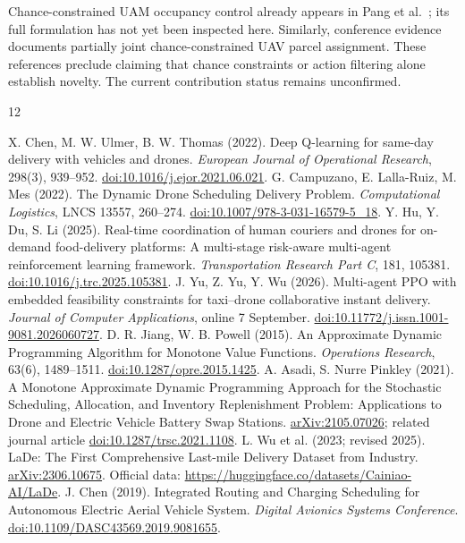 \documentclass[11pt,a4paper]{article}
\begin{document}
Chance-constrained UAM occupancy control already appears in Pang et al.\ \cite{pangchance}; its full formulation has not yet been inspected here. Similarly, conference evidence documents partially joint chance-constrained UAV parcel assignment. These references preclude claiming that chance constraints or action filtering alone establish novelty. The current contribution status remains unconfirmed.

\begin{thebibliography}{12}
\raggedright
{} X. Chen, M. W. Ulmer, B. W. Thomas (2022). Deep Q-learning for same-day delivery with vehicles and drones. \emph{European Journal of Operational Research}, 298(3), 939--952. \href{https://doi.org/10.1016/j.ejor.2021.06.021}{doi:10.1016/j.ejor.2021.06.021}.
 G. Campuzano, E. Lalla-Ruiz, M. Mes (2022). The Dynamic Drone Scheduling Delivery Problem. \emph{Computational Logistics}, LNCS 13557, 260--274. \href{https://doi.org/10.1007/978-3-031-16579-5_18}{doi:10.1007/978-3-031-16579-5\_18}.
 Y. Hu, Y. Du, S. Li (2025). Real-time coordination of human couriers and drones for on-demand food-delivery platforms: A multi-stage risk-aware multi-agent reinforcement learning framework. \emph{Transportation Research Part C}, 181, 105381. \href{https://doi.org/10.1016/j.trc.2025.105381}{doi:10.1016/j.trc.2025.105381}.
 J. Yu, Z. Yu, Y. Wu (2026). Multi-agent PPO with embedded feasibility constraints for taxi--drone collaborative instant delivery. \emph{Journal of Computer Applications}, online 7 September. \href{https://doi.org/10.11772/j.issn.1001-9081.2026060727}{doi:10.11772/j.issn.1001-9081.2026060727}.
 D. R. Jiang, W. B. Powell (2015). An Approximate Dynamic Programming Algorithm for Monotone Value Functions. \emph{Operations Research}, 63(6), 1489--1511. \href{https://doi.org/10.1287/opre.2015.1425}{doi:10.1287/opre.2015.1425}.
 A. Asadi, S. Nurre Pinkley (2021). A Monotone Approximate Dynamic Programming Approach for the Stochastic Scheduling, Allocation, and Inventory Replenishment Problem: Applications to Drone and Electric Vehicle Battery Swap Stations. \href{https://arxiv.org/abs/2105.07026}{arXiv:2105.07026}; related journal article \href{https://doi.org/10.1287/trsc.2021.1108}{doi:10.1287/trsc.2021.1108}.
 L. Wu et al. (2023; revised 2025). LaDe: The First Comprehensive Last-mile Delivery Dataset from Industry. \href{https://arxiv.org/abs/2306.10675}{arXiv:2306.10675}. Official data: \url{https://huggingface.co/datasets/Cainiao-AI/LaDe}.
 J. Chen (2019). Integrated Routing and Charging Scheduling for Autonomous Electric Aerial Vehicle System. \emph{Digital Avionics Systems Conference}. \href{https://doi.org/10.1109/DASC43569.2019.9081655}{doi:10.1109/DASC43569.2019.9081655}.

\end{thebibliography}
\end{document}
